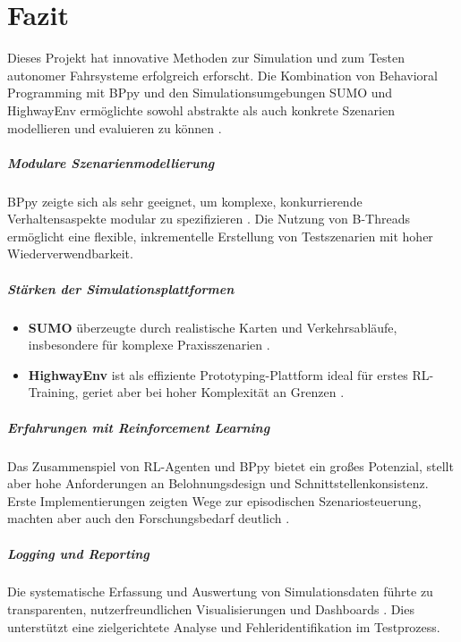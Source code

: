 \chapter{Fazit}

Dieses Projekt hat innovative Methoden zur Simulation und zum Testen autonomer Fahrsysteme erfolgreich erforscht. Die Kombination von Behavioral Programming mit BPpy und den Simulationsumgebungen SUMO und HighwayEnv ermöglichte sowohl abstrakte als auch konkrete Szenarien modellieren und evaluieren zu können \cite{EinfuehrungIntegrationsprojekt}.

\paragraph{Modulare Szenarienmodellierung}
BPpy zeigte sich als sehr geeignet, um komplexe, konkurrierende Verhaltensaspekte modular zu spezifizieren \cite{EinfuehrungIntegrationsprojekt}. Die Nutzung von B-Threads ermöglicht eine flexible, inkrementelle Erstellung von Testszenarien mit hoher Wiederverwendbarkeit.

\paragraph{Stärken der Simulationsplattformen}
\begin{itemize}
    \item \textbf{SUMO} überzeugte durch realistische Karten und Verkehrsabläufe, insbesondere für komplexe Praxisszenarien \cite{EinfuehrungIntegrationsprojekt}.
    \item \textbf{HighwayEnv} ist als effiziente Prototyping-Plattform ideal für erstes RL-Training, geriet aber bei hoher Komplexität an Grenzen \cite{EinfuehrungIntegrationsprojekt}.
\end{itemize}

\paragraph{Erfahrungen mit Reinforcement Learning}
Das Zusammenspiel von RL-Agenten und BPpy bietet ein großes Potenzial, stellt aber hohe Anforderungen an Belohnungsdesign und Schnittstellenkonsistenz. Erste Implementierungen zeigten Wege zur episodischen Szenariosteuerung, machten aber auch den Forschungsbedarf deutlich \cite{EinfuehrungIntegrationsprojekt}.

\paragraph{Logging und Reporting}
Die systematische Erfassung und Auswertung von Simulationsdaten führte zu transparenten, nutzerfreundlichen Visualisierungen und Dashboards \cite{EinfuehrungIntegrationsprojekt}. Dies unterstützt eine zielgerichtete Analyse und Fehleridentifikation im Testprozess.

